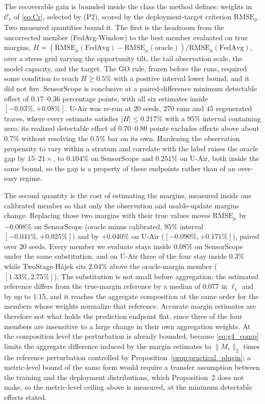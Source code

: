 \documentclass[letterpaper,journal]{IEEEtran}
\begin{document}
The recoverable gain is bounded inside the class the method defines: weights in
$\mathcal{C}_r$ of \eqref{eq:Cr}, selected by (P2), scored by the
deployment-target criterion $\mathrm{RMSE}_{\mu}$.  Two measured quantities bound
it.  The first is the headroom from the uncorrected member (FedAvg-Window) to the
best member evaluated on true margins,
$H=(\mathrm{RMSE}_{\mu}(\text{FedAvg})-\mathrm{RMSE}_{\mu}(\text{oracle}))/\mathrm{RMSE}_{\mu}(\text{FedAvg})$,
over a stress grid varying the opportunity tilt, the tail observation scale, the
model capacity, and the target.  The GO rule, frozen before the runs, required
some condition to reach $H\ge0.5\%$ with a positive interval lower bound, and it
did not fire.  SensorScope is conclusive at a paired-difference minimum
detectable effect of $0.17$--$0.36$ percentage points, with all six estimates
inside $[-0.03\%,+0.08\%]$.  U-Air was re-run at $20$ seeds, $270$ runs and $45$
regenerated traces, where every estimate satisfies $|H|\le0.217\%$ with a $95\%$
interval containing zero; its realized detectable effect of $0.70$--$0.80$ points
excludes effects above about $0.7\%$ without resolving the $0.5\%$ bar on its
own.  Hardening the observation propensity to vary within a stratum and correlate
with the label raises the oracle gap by $15$--$21\times$, to $0.104\%$ on
SensorScope and $0.251\%$ on U-Air, both inside the same bound, so the gap is a
property of these endpoints rather than of an over-easy regime.

The second quantity is the cost of estimating the margins, measured inside one
calibrated member so that only the observation and usable-update margins change.
Replacing those two margins with their true values moves $\mathrm{RMSE}_{\mu}$ by
$-0.008\%$ on SensorScope (oracle minus calibrated,
$95\%$ interval $[-0.041\%,+0.025\%]$) and by $+0.040\%$ on U-Air
($[-0.090\%,+0.171\%]$), paired over $20$ seeds.  Every member we evaluate stays
inside $0.08\%$ on SensorScope under the same substitution, and on U-Air three of
the four stay inside $0.3\%$ while TwoStage-H\'ajek sits $2.04\%$ above the
oracle-margin member ($[1.33\%,2.75\%]$).  The substitution is not small before
aggregation: the estimated reference differs from the true-margin reference by a
median of $0.077$ in $\ell_1$ and by up to $1.15$, and it reaches the aggregate
composition at the same order for the members whose weights normalize that
reference.  Accurate margin estimates are therefore not what holds the prediction
endpoint flat, since three of the four members are insensitive to a large change
in their own aggregation weights.  At the composition level the perturbation is
already bounded, because \eqref{eq:g4_comp} limits the aggregate difference
induced by the margin estimates to $\|M_r\|_2$ times the reference perturbation
controlled by Proposition~\ref{prop:practical_plugin}; a metric-level bound of
the same form would require a transfer assumption between the training and the
deployment distributions, which Proposition~2 does not make, so the metric-level
ceiling above is measured, at the minimum detectable effects stated.
\end{document}
